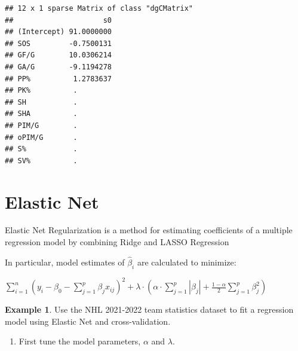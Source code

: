 \documentclass[
  11pt,
]{book}
\providecommand{\tightlist}{%
  \setlength{\itemsep}{0pt}\setlength{\parskip}{0pt}}
\theoremstyle{definition}
\theoremstyle{definition}
\newtheorem{example}{Example}[chapter]
\theoremstyle{definition}
\theoremstyle{definition}
\theoremstyle{remark}
\begin{document}
\begin{verbatim}
## 12 x 1 sparse Matrix of class "dgCMatrix"
##                     s0
## (Intercept) 91.0000000
## SOS         -0.7500131
## GF/G        10.0306214
## GA/G        -9.1194278
## PP%          1.2783637
## PK%          .        
## SH           .        
## SHA          .        
## PIM/G        .        
## oPIM/G       .        
## S%           .        
## SV%          .
\end{verbatim}

\newpage

\hypertarget{elastic-net}{%
\section{Elastic Net}\label{elastic-net}}

Elastic Net Regularization is a method for estimating coefficients of a multiple regression model by combining Ridge and LASSO Regression

In particular, model estimates of \(\hat{\beta}_i\) are calculated to minimize:

\(\sum_{i=1}^n (y_i - \beta_0 - \sum_{j=1}^p \beta_j x_{ij})^2 + \lambda \cdot \left( \alpha \cdot \sum_{j=1}^p |\beta_j| + \frac{1-\alpha}{2} \sum_{j=1}^p \beta_j^2 \right)\)

\begin{example}
Use the NHL 2021-2022 team statistics dataset to fit a regression model using Elastic Net and cross-validation.
\end{example}

\begin{enumerate}
\def\labelenumi{(\alph{enumi})}
\tightlist
\item
  First tune the model parameters, \(\alpha\) and \(\lambda\).
\end{enumerate}
\end{document}
